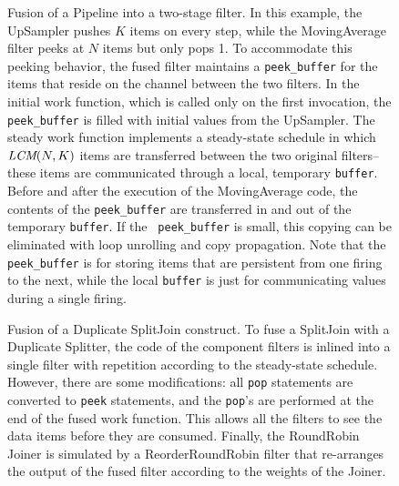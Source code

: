 \begin{figure}
\centering
{}
\vspace{-6pt}
\caption{\protect\small Fusion of a Pipeline into a two-stage filter.
In this example, the UpSampler pushes $K$ items on every step, while the
MovingAverage filter peeks at $N$ items but only pops 1.  To accommodate
this peeking behavior, the fused filter maintains a {\tt peek\_buffer}
for the items that reside on the channel between the two filters.  In
the initial work function, which is called only on the first
invocation, the {\tt peek\_buffer} is filled with initial values from
the UpSampler.  The steady work function implements a steady-state
schedule in which $\mbox{\it LCM}(N, K)$ items are transferred between the two
original filters--these items are communicated through a local,
temporary {\tt buffer}.  Before and after the execution of the
MovingAverage code, the contents of the {\tt peek\_buffer} are
transferred in and out of the temporary {\tt buffer}.  If the {\tt
peek\_buffer} is small, this copying can be eliminated with loop
unrolling and copy propagation.  Note that the {\tt peek\_buffer} is
for storing items that are persistent from one firing to the next,
while the local {\tt buffer} is just for communicating values during a
single firing. \label{fig:fuse-pipe}}
\vspace{-6pt}
\end{figure}

\begin{figure}
\centering
{}
\caption{\protect\small Fusion of a Duplicate SplitJoin construct.  To
fuse a SplitJoin with a Duplicate Splitter, the code of the component
filters is inlined into a single filter with repetition according to
the steady-state schedule.  However, there are some modifications: all
{\tt pop} statements are converted to {\tt peek} statements, and the
{\tt pop}'s are performed at the end of the fused work function.  This
allows all the filters to see the data items before they are consumed.
Finally, the RoundRobin Joiner is simulated by a ReorderRoundRobin
filter that re-arranges the output of the fused filter according to
the weights of the Joiner.  \protect\label{fig:fuse-splitjoin1}}
\vspace{-6pt}
\end{figure}

